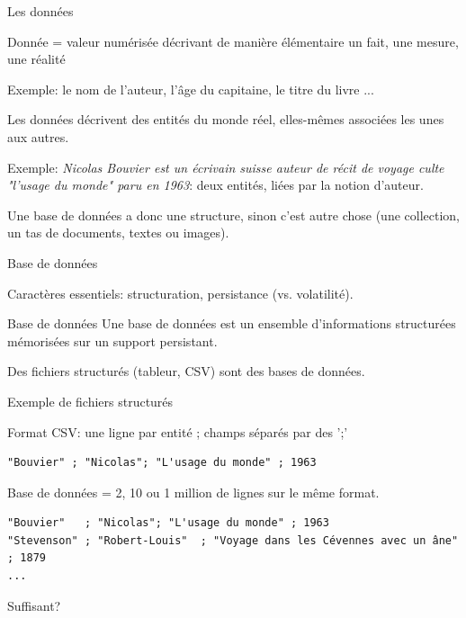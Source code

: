 \begin{frame}{Les données}

\alert{Donnée} = valeur numérisée décrivant de manière élémentaire
un fait, une mesure, une réalité

\smallskip

\alert{Exemple}: le nom de l'auteur, l'âge du capitaine, le titre du livre ...


\vfill

Les données décrivent des \alert{entités} du monde réel, elles-mêmes associées les unes aux autres.

\smallskip
\alert{Exemple}: \textit{Nicolas Bouvier est un écrivain suisse auteur de récit de voyage
culte "l'usage du monde" paru en 1963}: deux entités, liées par la notion d'auteur.

\vfill
\begin{blocgauche}
Une base de données a donc une \alert{structure}, sinon c'est autre chose
(une collection, un tas de documents, textes ou images).
\end{blocgauche}

\end{frame}


\begin{frame}{Base de  données}

Caractères essentiels: structuration, persistance (vs. volatilité).

\vfill

\begin{defblock}{Base de données}
Une base de données est un ensemble d’informations structurées mémorisées sur un support persistant.
\end{defblock}

\vfill


\begin{blocgauche}
Des fichiers structurés (tableur, CSV) sont des bases de données.
\end{blocgauche}

\end{frame}


\begin{frame}[fragile]{Exemple de fichiers structurés}

Format CSV: une ligne par entité ; champs séparés par des ';'
\begin{small}
\begin{verbatim}
"Bouvier" ; "Nicolas"; "L'usage du monde" ; 1963
\end{verbatim}
\end{small}
\vfill

Base de données = 2, 10 ou 1 million de lignes sur le même format.

\begin{small}
\begin{verbatim}
"Bouvier"   ; "Nicolas"; "L'usage du monde" ; 1963
"Stevenson" ; "Robert-Louis"  ; "Voyage dans les Cévennes avec un âne" ; 1879
...
\end{verbatim}
\end{small}

\vfill
Suffisant?
\end{frame}

